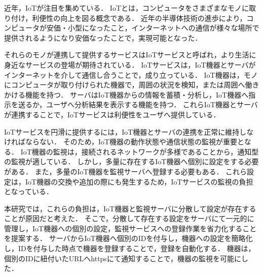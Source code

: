 近年，IoTが注目を集めている．
IoTとは，コンピュータをさまざまなモノに取り付け，利便性の向上を図る概念である．
近年の半導体技術の進歩により，コンピュータが安価・小型になったこと，インターネットへの通信が様々な場所で提供されるようになり安価なったことで，実現可能となった．
\medskip

それらのモノが連携して提供するサービスはIoTサービスと呼ばれ，より生活に身近なサービスの登場が期待されている．
IoTサービスは，IoT機器とサーバがインターネットを介して通信し合うことで，成り立っている．
IoT機器は，モノにコンピュータが取り付けられた機器で，周囲の状況を検知，または周囲へ働きかける機能を持つ．
サーバはIoT機器からの情報を蓄積・分析し，IoT機器へ指示を送るか，ユーザへ分析結果を表示する機能を持つ．
これらIoT機器とサーバが連携することで，IoTサービスは利便性をユーザへ提供している．
\medskip

IoTサービスを円滑に提供するには，IoT機器とサーバの連携を正常に維持しなければならない．
そのため，IoT機器の動作状態や通信状態の監視が重要となる．
IoT機器の監視は，接続されるネットワークが多様であることから，通知型の監視が適している．
しかし，多量に存在するIoT機器へ個別に設定をする必要がある．
また，多量のIoT機器を監視サーバへ登録する必要もある．
これら設定は，IoT機器の交換や追加の際にも発生するため，IoTサービスの監視の負担となっている．
\medskip

本研究では，これらの負担は，IoT機器と監視サーバに分散して設定が存在することが原因だと考えた．
そこで，分散して存在する設定をサーバにて一元的に管理し，IoT機器への個別の設定，監視サービスへの登録作業を省力化することを提案する．
サーバからIoT機器へ個別のIDを付与し，機器への設定を簡略化し，IDを付与した時点で機器を登録することで，登録を自動化する．
機器は，個別のIDに紐付いたURLへhttpsにて通知することで，機器の監視を可能にした．

